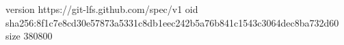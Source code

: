 version https://git-lfs.github.com/spec/v1
oid sha256:8f1c7e8cd30e57873a5331c8db1eec242b5a76b841c1543c3064dec8ba732d60
size 380800
